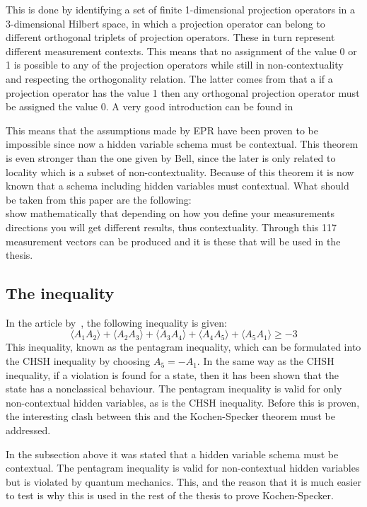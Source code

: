 This is done by identifying a set of finite 1-dimensional projection operators in a 3-dimensional Hilbert space, in which a projection operator can belong to different orthogonal triplets of projection operators. These in turn represent different measurement contexts. This means that no assignment of the value 0 or 1 is possible to any of the projection operators while still in non-contextuality and respecting the orthogonality relation. The latter comes from that a if a projection operator has the value 1 then any orthogonal projection operator must be assigned the value 0. A very good introduction can be found in \cite{Bub2010}

This means that the assumptions made by EPR have been proven to be impossible since now a hidden variable schema must be contextual. This theorem is even stronger than the one given by Bell, since the later is only related to locality which is a subset of non-contextuality. 
Because of this theorem it is now known that a schema including hidden variables must contextual.
What should be taken from this paper are the following:\\
\cite{Kochen1968The} show mathematically that depending on how you define your measurements directions you will get different results, thus contextuality. Through this 117 measurement vectors can be produced and it is these that will be used in the thesis. 
\subsection{The inequality}\label{sec:intro:Background of quantum mechanics:Ine}
In the article by~\cite{PhysRevLett.101.020403}, the following inequality is given:
\begin{equation} \label{eq:Inequality}
\langle A_1 A_2 \rangle + \langle A_2 A_3 \rangle + \langle A_3 A_4 \rangle + \langle A_4 A_5 \rangle +
\langle A_5 A_1 \rangle \geq -3
\end{equation}
This inequality, known as the pentagram inequality, which can be formulated into the CHSH inequality by choosing $A_5 = -A_1$.
In the same way as the CHSH inequality, if a violation is found for a state, then it has been shown that the state has a nonclassical behaviour. The pentagram inequality is valid for only non-contextual hidden variables, as is the CHSH inequality. Before this is proven, the interesting clash between this and the Kochen-Specker theorem must be addressed.

In the subsection above it was stated that a hidden variable schema must be contextual. The pentagram inequality is valid for non-contextual hidden variables but is violated by quantum mechanics. This, and the reason that it is much easier to test is why this is used in the rest of the thesis to prove Kochen-Specker.

